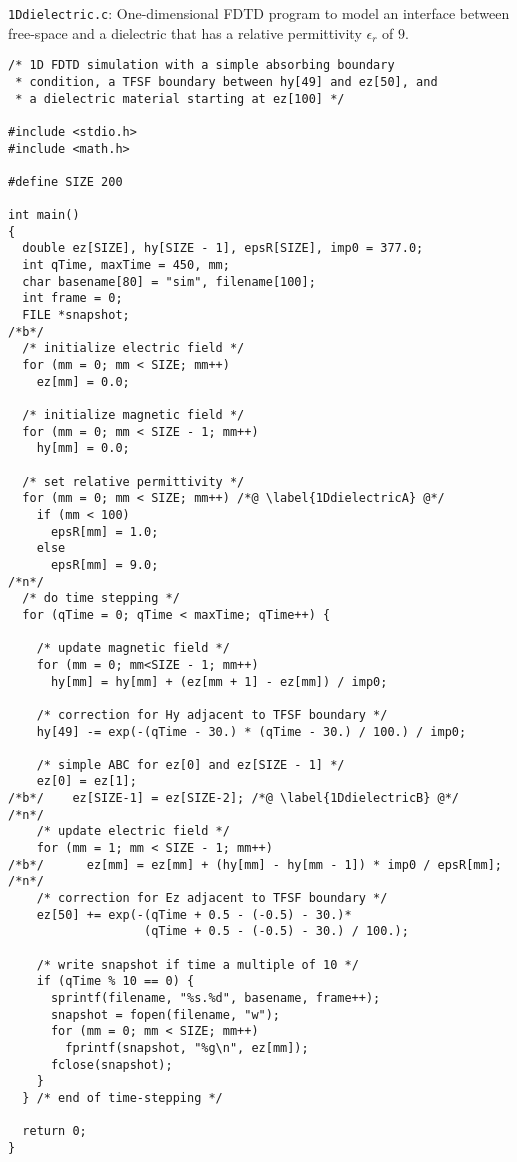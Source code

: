 \begin{program}
{\tt 1Ddielectric.c}: 
One-dimensional FDTD program to model an interface between free-space
and a dielectric that has a relative permittivity $\epsilon_r$ of
$9$. \label{pro:1Ddielectric}
\codemiddle
\begin{lstlisting}
/* 1D FDTD simulation with a simple absorbing boundary
 * condition, a TFSF boundary between hy[49] and ez[50], and
 * a dielectric material starting at ez[100] */

#include <stdio.h>
#include <math.h>

#define SIZE 200

int main()
{
  double ez[SIZE], hy[SIZE - 1], epsR[SIZE], imp0 = 377.0;
  int qTime, maxTime = 450, mm;
  char basename[80] = "sim", filename[100];
  int frame = 0;
  FILE *snapshot;
/*b*/
  /* initialize electric field */
  for (mm = 0; mm < SIZE; mm++)
    ez[mm] = 0.0;

  /* initialize magnetic field */
  for (mm = 0; mm < SIZE - 1; mm++)
    hy[mm] = 0.0;

  /* set relative permittivity */
  for (mm = 0; mm < SIZE; mm++) /*@ \label{1DdielectricA} @*/
    if (mm < 100)
      epsR[mm] = 1.0;
    else
      epsR[mm] = 9.0;
/*n*/
  /* do time stepping */
  for (qTime = 0; qTime < maxTime; qTime++) {

    /* update magnetic field */
    for (mm = 0; mm<SIZE - 1; mm++)
      hy[mm] = hy[mm] + (ez[mm + 1] - ez[mm]) / imp0;

    /* correction for Hy adjacent to TFSF boundary */
    hy[49] -= exp(-(qTime - 30.) * (qTime - 30.) / 100.) / imp0;

    /* simple ABC for ez[0] and ez[SIZE - 1] */
    ez[0] = ez[1];
/*b*/    ez[SIZE-1] = ez[SIZE-2]; /*@ \label{1DdielectricB} @*/
/*n*/
    /* update electric field */
    for (mm = 1; mm < SIZE - 1; mm++)
/*b*/      ez[mm] = ez[mm] + (hy[mm] - hy[mm - 1]) * imp0 / epsR[mm];
/*n*/
    /* correction for Ez adjacent to TFSF boundary */
    ez[50] += exp(-(qTime + 0.5 - (-0.5) - 30.)*
                   (qTime + 0.5 - (-0.5) - 30.) / 100.);

    /* write snapshot if time a multiple of 10 */
    if (qTime % 10 == 0) {
      sprintf(filename, "%s.%d", basename, frame++);
      snapshot = fopen(filename, "w");
      for (mm = 0; mm < SIZE; mm++)
        fprintf(snapshot, "%g\n", ez[mm]);
      fclose(snapshot);
    }
  } /* end of time-stepping */

  return 0;
}
\end{lstlisting}
\end{program}

